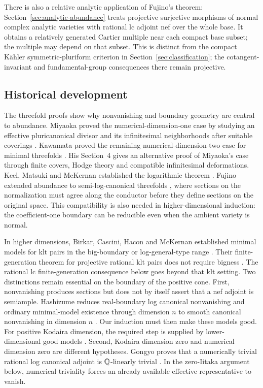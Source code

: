 There is also a relative analytic application of Fujino's theorem:
Section~\ref{sec:analytic-abundance} treats projective surjective morphisms
of normal complex analytic varieties with rational lc adjoint nef over
the whole base. It obtains a relatively generated Cartier multiple near
each compact base subset; the multiple may depend on that subset.
This is distinct from the compact K\"ahler symmetric-pluriform criterion
in Section~\ref{sec:classification}; the cotangent-invariant and
fundamental-group consequences there remain projective.

\subsection*{Historical development}
The threefold proofs show why nonvanishing and boundary geometry are
central to abundance. Miyaoka proved the numerical-dimension-one case
by studying an effective pluricanonical divisor and its infinitesimal
neighborhoods after suitable coverings \cite{Miyaoka1988}. Kawamata proved
the remaining numerical-dimension-two case for minimal threefolds
\cite[Theorem~3.1]{Kawamata1992}. His Section~4 gives an alternative proof of
Miyaoka's case through finite covers, Hodge theory and compatible
infinitesimal deformations. Keel, Matsuki and
McKernan established the logarithmic theorem
\cite{KeelMatsukiMcKernan1994,Matsuki2003Correction,
KeelMatsukiMcKernan2004Correction}.
Fujino extended abundance to semi-log-canonical threefolds
\cite{Fujino2000}, where sections on the normalization must agree along
the conductor before they define sections on the original space. This
compatibility is also needed in higher-dimensional induction: the
coefficient-one boundary can be reducible even when the ambient variety
is normal.

In higher dimensions, Birkar, Cascini, Hacon and McKernan established
minimal models for klt pairs in the big-boundary or log-general-type range
\cite{BCHM2010}. Their finite-generation theorem for
projective rational klt pairs does not require bigness
\cite[Corollary~1.1.2]{BCHM2010}. The rational lc finite-generation
consequence below goes beyond that klt setting.
Two distinctions remain essential on the boundary
of the positive cone. First, nonvanishing produces sections but does not
by itself assert that a nef adjoint is semiample. Hashizume reduces
real-boundary log canonical nonvanishing and ordinary minimal-model
existence through dimension $n$ to smooth canonical nonvanishing in
dimension $n$ \cite[Theorem~1.4]{Hashizume2018}. Our induction must then
make these models good. For positive Kodaira dimension, the required
step is supplied by lower-dimensional good models
\cite[Lemma~3.5]{FujinoGongyoRings2014}. Second, Kodaira dimension zero
and numerical dimension zero are different hypotheses. Gongyo proves
that a numerically trivial rational log canonical adjoint is
$\mathbb{Q}$-linearly trivial \cite[Theorem~1.2]{Gongyo2013}. In the
zero-Iitaka argument below, numerical triviality forces an already
available effective representative to vanish.


